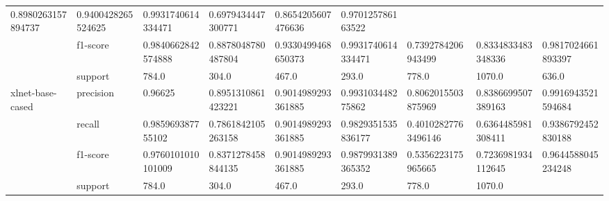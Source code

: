\begin{landscape}
\begin{table}[]
{\begin{tabular}{@{}lllllllll@{}}
  \multicolumn{1}{l|}{0.8980263157894737} &
  \multicolumn{1}{l|}{0.9400428265524625} &
  \multicolumn{1}{l|}{0.9931740614334471} &
  \multicolumn{1}{l|}{0.6979434447300771} &
  \multicolumn{1}{l|}{0.8654205607476636} &
  \multicolumn{1}{l|}{0.970125786163522} \\ \cmidrule(l){2-9} 
\multicolumn{1}{|l|}{} &
  \multicolumn{1}{l|}{f1-score} &
  \multicolumn{1}{l|}{0.9840662842574888} &
  \multicolumn{1}{l|}{0.8878048780487804} &
  \multicolumn{1}{l|}{0.9330499468650373} &
  \multicolumn{1}{l|}{0.9931740614334471} &
  \multicolumn{1}{l|}{0.7392784206943499} &
  \multicolumn{1}{l|}{0.8334833483348336} &
  \multicolumn{1}{l|}{0.9817024661893397} \\ \cmidrule(l){2-9} 
\multicolumn{1}{|l|}{} &
  \multicolumn{1}{l|}{support} &
  \multicolumn{1}{l|}{784.0} &
  \multicolumn{1}{l|}{304.0} &
  \multicolumn{1}{l|}{467.0} &
  \multicolumn{1}{l|}{293.0} &
  \multicolumn{1}{l|}{778.0} &
  \multicolumn{1}{l|}{1070.0} &
  \multicolumn{1}{l|}{636.0} \\ \midrule
\multicolumn{1}{|l|}{\multirow{4}{*}{xlnet-base-cased}} &
  \multicolumn{1}{l|}{precision} &
  \multicolumn{1}{l|}{0.96625} &
  \multicolumn{1}{l|}{0.8951310861423221} &
  \multicolumn{1}{l|}{0.9014989293361885} &
  \multicolumn{1}{l|}{0.993103448275862} &
  \multicolumn{1}{l|}{0.8062015503875969} &
  \multicolumn{1}{l|}{0.8386699507389163} &
  \multicolumn{1}{l|}{0.9916943521594684} \\ \cmidrule(l){2-9} 
\multicolumn{1}{|l|}{} &
  \multicolumn{1}{l|}{recall} &
  \multicolumn{1}{l|}{0.985969387755102} &
  \multicolumn{1}{l|}{0.7861842105263158} &
  \multicolumn{1}{l|}{0.9014989293361885} &
  \multicolumn{1}{l|}{0.9829351535836177} &
  \multicolumn{1}{l|}{0.40102827763496146} &
  \multicolumn{1}{l|}{0.6364485981308411} &
  \multicolumn{1}{l|}{0.9386792452830188} \\ \cmidrule(l){2-9} 
\multicolumn{1}{|l|}{} &
  \multicolumn{1}{l|}{f1-score} &
  \multicolumn{1}{l|}{0.9760101010101009} &
  \multicolumn{1}{l|}{0.8371278458844135} &
  \multicolumn{1}{l|}{0.9014989293361885} &
  \multicolumn{1}{l|}{0.9879931389365352} &
  \multicolumn{1}{l|}{0.5356223175965665} &
  \multicolumn{1}{l|}{0.7236981934112645} &
  \multicolumn{1}{l|}{0.9644588045234248} \\ \cmidrule(l){2-9} 
\multicolumn{1}{|l|}{} &
  \multicolumn{1}{l|}{support} &
  \multicolumn{1}{l|}{784.0} &
  \multicolumn{1}{l|}{304.0} &
  \multicolumn{1}{l|}{467.0} &
  \multicolumn{1}{l|}{293.0} &
  \multicolumn{1}{l|}{778.0} &
  \multicolumn{1}{l|}{1070.0} &

\end{tabular}}
\end{table}
\end{landscape}
